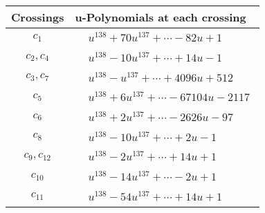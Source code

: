 \documentclass[1p]{elsarticle_modified}
\theoremstyle{definition}
\begin{document}
\begin{tabular}{m{50pt}|m{274pt}}
Crossings & \hspace{64pt}u-Polynomials at each crossing \\
\hline $$\begin{aligned}c_{1}\end{aligned}$$&$\begin{aligned}
&u^{138}+70 u^{137}+\cdots-82 u+1
\end{aligned}$\\
\hline $$\begin{aligned}c_{2},c_{4}\end{aligned}$$&$\begin{aligned}
&u^{138}-10 u^{137}+\cdots+14 u-1
\end{aligned}$\\
\hline $$\begin{aligned}c_{3},c_{7}\end{aligned}$$&$\begin{aligned}
&u^{138}- u^{137}+\cdots+4096 u+512
\end{aligned}$\\
\hline $$\begin{aligned}c_{5}\end{aligned}$$&$\begin{aligned}
&u^{138}+6 u^{137}+\cdots-67104 u-2117
\end{aligned}$\\
\hline $$\begin{aligned}c_{6}\end{aligned}$$&$\begin{aligned}
&u^{138}+2 u^{137}+\cdots-2626 u-97
\end{aligned}$\\
\hline $$\begin{aligned}c_{8}\end{aligned}$$&$\begin{aligned}
&u^{138}-10 u^{137}+\cdots+2 u-1
\end{aligned}$\\
\hline $$\begin{aligned}c_{9},c_{12}\end{aligned}$$&$\begin{aligned}
&u^{138}-2 u^{137}+\cdots+14 u+1
\end{aligned}$\\
\hline $$\begin{aligned}c_{10}\end{aligned}$$&$\begin{aligned}
&u^{138}-14 u^{137}+\cdots-2 u+1
\end{aligned}$\\
\hline $$\begin{aligned}c_{11}\end{aligned}$$&$\begin{aligned}
&u^{138}-54 u^{137}+\cdots+14 u+1
\end{aligned}$\\
\hline
\end{tabular}\\~\\
\end{document}
